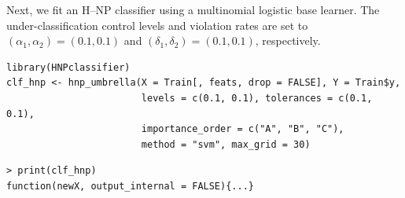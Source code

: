 Next, we fit an H--NP classifier using a multinomial logistic base learner. The under-classification control levels and violation rates are set to \((\alpha_1,\alpha_2)=(0.1,0.1)\) and \((\delta_1,\delta_2)=(0.1,0.1)\), respectively.
\begin{verbatim}
library(HNPclassifier)
clf_hnp <- hnp_umbrella(X = Train[, feats, drop = FALSE], Y = Train$y,               
                        levels = c(0.1, 0.1), tolerances = c(0.1, 0.1), 
                        importance_order = c("A", "B", "C"), 
                        method = "svm", max_grid = 30)
\end{verbatim}
\begin{verbatim}
> print(clf_hnp)
function(newX, output_internal = FALSE){...}
\end{verbatim}
    
    
    
    
    
    
